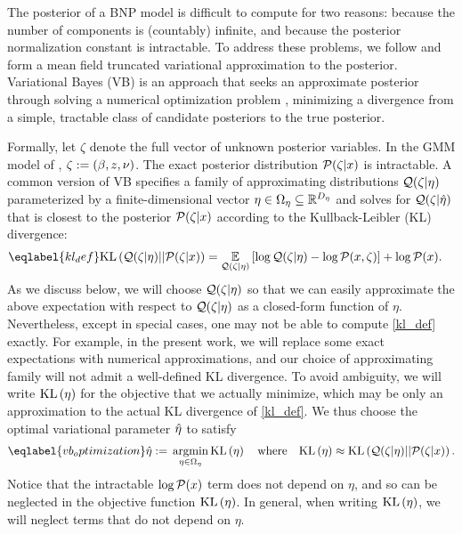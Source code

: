 The posterior of a BNP model is difficult to compute for two reasons: because
the number of components is (countably) infinite, and because the posterior
normalization constant is intractable.  To address these problems, we follow
\citet{blei:2006:vi_for_dp} and form a mean field truncated variational
approximation to the posterior. Variational Bayes (VB) is an approach that seeks
an approximate posterior through solving a numerical optimization problem
\citep{jordan:1999:vi, wainwright:2008:graphical_models, blei:2017:vi_review},
minimizing a divergence from a simple, tractable class of candidate posteriors
to the true posterior.

Formally, let $\zeta$ denote the full vector of unknown posterior variables. In
the GMM model of , $\zeta := (\beta, z, \nu)$.  The
exact posterior distribution $\mathcal{P}(\zeta \vert x)$ is intractable. A common
version of VB specifies a family of approximating distributions $\mathcal{Q}(\zeta \vert
\eta)$ parameterized by a finite-dimensional vector $\eta \in \Omega_{\eta} \subseteq
\mathbb{R}^{{D_{\eta}}}$ and solves for $\mathcal{Q}(\zeta\vert\hat\eta)$ that is closest to
the posterior $\mathcal{P}(\zeta \vert x)$ according to  the Kullback-Leibler (KL)
divergence:
%
\begin{align}\eqlabel{kl_def}
%
\KL{\q(\zeta \vert \eta) || \p(\zeta \vert \x)}
={}&    \expect{\q(\zeta \vert \eta)}{
        \log \q(\zeta \vert \eta) - \logp(\x, \zeta)} + \logp(\x).
%
\end{align}
%
As we discuss below, we will choose $\mathcal{Q}(\zeta \vert \eta)$ so that we can easily
approximate the above expectation with respect to $\mathcal{Q}(\zeta \vert \eta)$ as a
closed-form function of $\eta$.  Nevertheless, except in special cases, one may
not be able to compute \eqref{kl_def} exactly.  For example, in the present
work, we will replace some exact expectations with numerical approximations, and
our choice of approximating family will not admit a well-defined KL divergence.
To avoid ambiguity, we will write $\mathrm{KL}\left(\eta\right)$ for the objective that we actually
minimize, which may be only an approximation to the actual KL divergence of
\eqref{kl_def}.  We thus choose the optimal variational parameter $\hat\eta$ to
satisfy
%
\begin{align}\eqlabel{vb_optimization}
%
\etaopt :={} \argmin_{\eta \in \etadom} \KL{\eta} \mathwhere
\KL{\eta} \approx{} \KL{\q(\zeta \vert \eta) || \p(\zeta \vert \x)}.
%
\end{align}
%
Notice that the intractable $\log \mathcal{P}(x)$ term does not depend on $\eta$, and so
can be neglected in the objective function $\mathrm{KL}\left(\eta\right)$.  In general, when
writing $\mathrm{KL}\left(\eta\right)$, we will neglect terms that do not depend on $\eta$.

